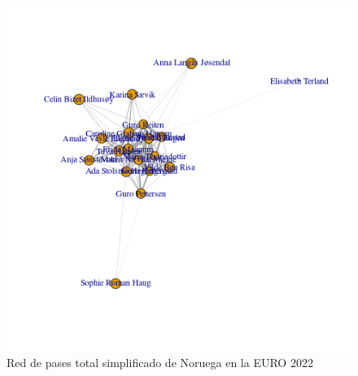 \begin{figure}[h!tbp]
  \centering
   \includegraphics[width=\textwidth]{./img/plot_norw_simpl.png}
   \caption{Red de pases total simplificado de Noruega en la EURO 2022}
   \label{img:red:simpl:nor}
\end{figure}

